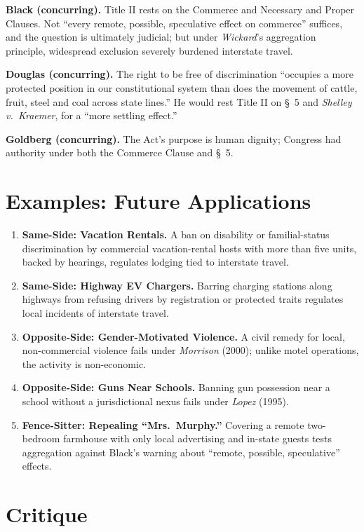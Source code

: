 \documentclass[12pt]{article}
\begin{document}
\textbf{Black (concurring).} Title II rests on the Commerce and Necessary and Proper Clauses. Not ``every remote, possible, speculative effect on commerce'' suffices, and the question is ultimately judicial; but under \textit{Wickard}'s aggregation principle, widespread exclusion severely burdened interstate travel.

\textbf{Douglas (concurring).} The right to be free of discrimination ``occupies a more protected position in our constitutional system than does the movement of cattle, fruit, steel and coal across state lines.'' He would rest Title II on \S~5 and \textit{Shelley v.\ Kraemer}, for a ``more settling effect.''

\textbf{Goldberg (concurring).} The Act's purpose is human dignity; Congress had authority under both the Commerce Clause and \S~5.

\section{Examples: Future Applications}

\begin{enumerate}
\item \textbf{Same-Side: Vacation Rentals.} A ban on disability or familial-status discrimination by commercial vacation-rental hosts with more than five units, backed by hearings, regulates lodging tied to interstate travel.
\item \textbf{Same-Side: Highway EV Chargers.} Barring charging stations along highways from refusing drivers by registration or protected traits regulates local incidents of interstate travel.
\item \textbf{Opposite-Side: Gender-Motivated Violence.} A civil remedy for local, non-commercial violence fails under \textit{Morrison} (2000); unlike motel operations, the activity is non-economic.
\item \textbf{Opposite-Side: Guns Near Schools.} Banning gun possession near a school without a jurisdictional nexus fails under \textit{Lopez} (1995).
\item \textbf{Fence-Sitter: Repealing ``Mrs.\ Murphy.''} Covering a remote two-bedroom farmhouse with only local advertising and in-state guests tests aggregation against Black's warning about ``remote, possible, speculative'' effects.
\end{enumerate}

\section{Critique}
\end{document}
